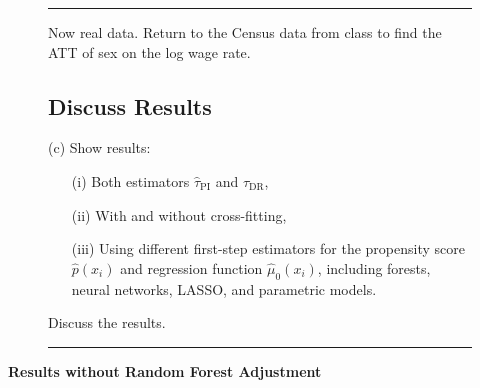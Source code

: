 \documentclass{article}
\newenvironment{colorparagraph}[1]{\par\color{#1}}{\par}
\begin{document}
\begin{figure}[H]
  \begin{colorparagraph}{questioncolor}
  \rule{\textwidth}{0.5pt}

    Now real data. Return to the Census data from class to find the ATT of sex on the log wage rate.

  \label{q2c}
  \subsection{Discuss Results}
  (c) Show results:
  \begin{itemize}
      \item[(i)] Both estimators $\hat{\tau}_{\text{PI}}$ and $\hat{\tau}_{\text{DR}}$,
      \item[(ii)] With and without cross-fitting,
      \item[(iii)] Using different first-step estimators for the propensity score \( \hat{p}(x_i) \) and regression function \( \hat{\mu}_0(x_i) \), including forests, neural networks, LASSO, and parametric models.
  \end{itemize}

  Discuss the results.

  \rule{\textwidth}{0.5pt}
  \end{colorparagraph}
\end{figure}


\textbf{Results without Random Forest Adjustment}
\end{document}
